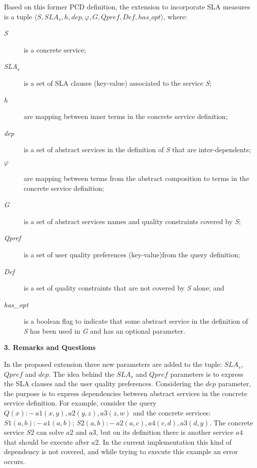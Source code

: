 \documentclass[12pt,a4paper,oneside]{report}
\begin{document}
Based on this former PCD definition, the extension to incorporate SLA measures is a tuple $\langle S, SLA_s, h, dep, \varphi, G, Qpref, Def, has\_opt\rangle$, where: 
\begin{description}
\item[\textit{S}] is a concrete service;
\item[\textit{SLA$_s$}] is a set of SLA clauses (key-value) associated to the service \textit{S};
\item[\textit{h}] are mapping between inner terms in the concrete service definition;
\item[\textit{dep}] is a set of abstract services in the definition of \textit{S} that are inter-dependents;
\item[\textit{$\varphi$}] are mapping between terms from the abstract composition to terms in the concrete service definition;
\item[\textit{G}] is a set of abstract services names and quality constraints covered by \textit{S};
\item[\textit{Qpref}] is a set of user quality preferences (key-value)from the query definition;
\item[\textit{Def}] is a set of quality constraints that are not covered by \textit{S} alone; and
\item[\textit{has\_opt}] is a boolean flag to indicate that some abstract service in the definition of \textit{S} has been used in \textit{G} and has an optional parameter.
\end{description}

\begin{flushleft}
\textbf{3. Remarks and Questions}
\end{flushleft}

In the proposed extension three new parameters are added to the tuple: \textbf{$SLA_s$}, \textbf{$Qpref$} and \textbf{$dep$}. The idea behind the \textbf{$SLA_s$} and \textbf{$Qpref$} parameters is to express the SLA clauses and the user quality preferences. Considering the $dep$ parameter, the purpose is to express dependencies between abstract services in the concrete service definition. For example, consider the query $Q(x) :-  \ a1(x,y),a2(y,z),a3(z,w)$ and the concrete services: $S1(a,b) :- \ a1(a,b)$; $S2(a,b) :- \ a2(a,c),a4(c, d),a3(d,y)$. The concrete service $S2$ can solve $a2$ and $a3$, but on its definition there is another service $a4$ that should be execute after $a2$. In the current implementation this kind of dependency is not covered, and while trying to execute this example an error occurs. 
\end{document}
